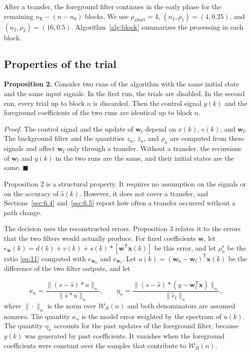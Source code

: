 \documentclass[sip,biber]{now-journal}
\begin{document}
After a transfer, the foreground filter continues in the early phase for the remaining \(n_{\mathrm E} - (n - n_0)\) blocks. We use \(\rho_{\mathrm{abort}} = 4\), \((n_1, \rho_1) = (4, 0.25)\), and \((n_2, \rho_2) = (16, 0.5)\). Algorithm~\ref{alg:block} summarizes the processing in each block.

\hypertarget{sec:4.7}{%
\subsection{Properties of the trial}\label{sec:4.7}}

\textbf{Proposition 2.} Consider two runs of the algorithm with the same initial state and the same input signals. In the first run, the trials are disabled. In the second run, every trial up to block \(n\) is discarded. Then the control signal \(y(k)\) and the foreground coefficients of the two runs are identical up to block \(n\).

\emph{Proof.} The control signal and the update of \(\mathbf{w}_{\mathrm f}\) depend on \(x(k)\), \(e(k)\), and \(\mathbf{w}_{\mathrm f}\). The background filter and the quantities \(z_n\), \(\bar{z}_n\), and \(\rho_n\) are computed from these signals and affect \(\mathbf{w}_{\mathrm f}\) only through a transfer. Without a transfer, the recursions of \(\mathbf{w}_{\mathrm f}\) and \(y(k)\) in the two runs are the same, and their initial states are the same. \(\blacksquare\)

Proposition 2 is a structural property. It requires no assumption on the signals or on the accuracy of \(\hat{s}(k)\). However, it does not cover a transfer, and Sections~\ref{sec:6.4} and~\ref{sec:6.5} report how often a transfer occurred without a path change.

The decision uses the reconstructed errors. Proposition 3 relates it to the errors that the two filters would actually produce. For fixed coefficients \(\mathbf{w}\), let \(e_{\mathbf{w}}(k) = d(k) + v(k) + s(k) * [\mathbf{w}^{\mathsf T}\mathbf{x}(k)]\) be this error, and let \(\rho^{\star}_n\) be the ratio \eqref{eq:11} computed with \(e_{\mathbf{w}_{\mathrm b}}\) and \(e_{\mathbf{w}_{\mathrm f}}\). Let \(u(k) = (\mathbf{w}_{\mathrm b} - \mathbf{w}_{\mathrm f})^{\mathsf T}\mathbf{x}(k)\) be the difference of the two filter outputs, and let

\begin{equation}\label{eq:12}\kappa_n = \frac{\| (s - \hat{s}) * u \|_n}{\| \hat{s} * u \|_n}, \qquad \eta_n = \frac{\| (s - \hat{s}) * (y - \mathbf{w}_{\mathrm f}^{\mathsf T}\mathbf{x}) \|_n}{\| \tilde{e}_{\mathrm f} \|_n},\end{equation} where \(\|\cdot\|_n\) is the norm over \(\mathcal{W}_B(n)\) and both denominators are assumed nonzero. The quantity \(\kappa_n\) is the model error weighted by the spectrum of \(u(k)\). The quantity \(\eta_n\) accounts for the past updates of the foreground filter, because \(y(k)\) was generated by past coefficients. It vanishes when the foreground coefficients were constant over the samples that contribute to \(\mathcal{W}_B(n)\).
\end{document}
